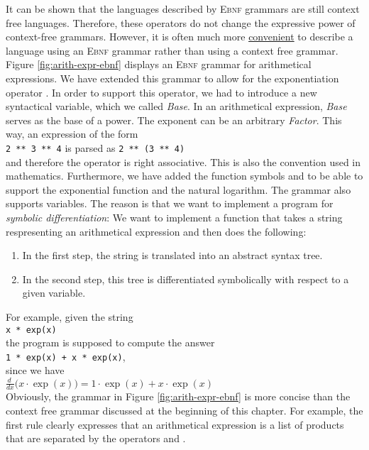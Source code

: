 It can be shown that the languages described by \textsc{Ebnf} grammars are still context
free languages.  Therefore, these operators do not change the expressive power of context-free
grammars. 
However, it is often much more \underline{convenient} to describe a language using an \textsc{Ebnf}
grammar rather than using a context free grammar.  Figure \ref{fig:arith-expr-ebnf}
displays an \textsc{Ebnf} grammar for arithmetical expressions.  We have extended this
grammar to allow for the exponentiation operator \squoted{**}.  In order to support this
operator, we had to introduce a new syntactical variable, which we called \textsl{Base}.
In an arithmetical expression, \textsl{Base} serves as the base of a power.  The
exponent can be an arbitrary \textsl{Factor}.  This way, an expression of the form
\\[0.2cm]
\hspace*{1.3cm}
\texttt{2 ** 3 ** 4}  \quad is parsed as \quad
\texttt{2 ** (3 ** 4)}
\\[0.2cm]
and therefore the operator \squoted{**} is right associative.  This is also the convention used in
mathematics. 
Furthermore, we have added the function symbols  and  to be able to
support the exponential function and the natural logarithm.  The grammar also supports
variables.  The reason is that we want to implement a program for \emph{symbolic differentiation}:
We want to implement a function that takes a string respresenting an 
arithmetical expression and then does the following:
\begin{enumerate}
\item In the first step, the string is translated into an abstract syntax tree.
\item In the second step, this tree is differentiated symbolically with respect to
      a given variable.
\end{enumerate}
For example, given the string
\\[0.2cm]
\hspace*{1.3cm}
\texttt{x * exp(x)}
\\[0.2cm]
the program is supposed to compute the answer
\\[0.2cm]
\hspace*{1.3cm}
\texttt{1 * exp(x) + x * exp(x)},
\\[0.2cm]
since we have
\\[0.2cm]
\hspace*{1.3cm}
$\frac{d\;}{dx} \bigl(x \cdot \exp(x)\bigr) = 1 \cdot \exp(x) + x \cdot \exp(x)$
\\[0.2cm]
Obviously, the grammar in Figure \ref{fig:arith-expr-ebnf}  is
more concise than the context free grammar discussed at the beginning of this chapter.
For example, the first rule clearly expresses that an arithmetical expression is a list of
products that are separated by the operators \squoted{+} and \squoted{-}.

